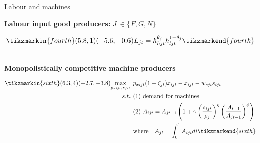 \documentclass[11pt,aspectratio=169]{beamer}
\begin{document}
\begin{frame}{ Labour and machines}
	
	\textbf{Labour input good producers:} $J\ \in\{F,G,N\}$\\ \vspace{0mm}
	\begin{minipage}[t!]{1\textwidth}
		\begin{align*}
		\tikzmarkin{fourth}(5.8,1)(-5.6,-0.6)
		L_{jt}=h_{hjt}^{\theta_{j}}h_{ljt}^{1-\theta_{j}}
		\tikzmarkend{fourth}
		\end{align*}
	\end{minipage}
	\\
	
	\vspace{7mm}
	\textbf{Monopolistically competitive machine producers }\\ \vspace{-1mm}
	\begin{minipage}[t!]{1\textwidth}
		\begin{align*}
		\tikzmarkin{sixth}(6.3,4)(-2.7,-3.8)
		\underset{p_{xijt}, s_{jit}}{\max}\ & p_{xijt}(1+\zeta_{jt})x_{ijt}-x_{ijt}-w_{sjt}s_{ijt}\\
		s.t.\ &(1)\ \text{demand for machines }\\ %
		& {(2)\ A_{ijt}=A_{jt-1}\left(1+\gamma\left(\frac{s_{ijt}}{\rho_j}\right)^\eta\left(\frac{A_{t-1}}{A_{jt-1}}\right)^\phi\right)}\\
		& {\text{where}\ \ \ A_{jt}=\int_{0}^{1}A_{ijt} di}
		\tikzmarkend{sixth}
		\end{align*}
	\end{minipage}
\end{frame}
%
\end{document}
